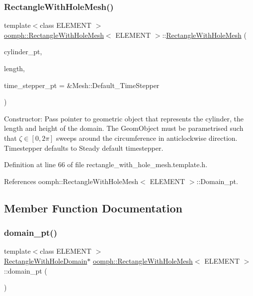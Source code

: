 \subsubsection{\texorpdfstring{Rectangle\+With\+Hole\+Mesh()}{RectangleWithHoleMesh()}}
{\footnotesize\ttfamily template$<$class E\+L\+E\+M\+E\+NT $>$ \\
\hyperlink{classoomph_1_1RectangleWithHoleMesh}{oomph\+::\+Rectangle\+With\+Hole\+Mesh}$<$ E\+L\+E\+M\+E\+NT $>$\+::\hyperlink{classoomph_1_1RectangleWithHoleMesh}{Rectangle\+With\+Hole\+Mesh} (\begin{DoxyParamCaption}\item[{Geom\+Object $\ast$}]{cylinder\+\_\+pt,  }\item[{const double \&}]{length,  }\item[{Time\+Stepper $\ast$}]{time\+\_\+stepper\+\_\+pt = {\ttfamily \&Mesh\+:\+:Default\+\_\+TimeStepper} }\end{DoxyParamCaption})\hspace{0.3cm}{\ttfamily [inline]}}



Constructor\+: Pass pointer to geometric object that represents the cylinder, the length and height of the domain. The Geom\+Object must be parametrised such that $\zeta \in [0,2\pi]$ sweeps around the circumference in anticlockwise direction. Timestepper defaults to Steady default timestepper. 



Definition at line 66 of file rectangle\+\_\+with\+\_\+hole\+\_\+mesh.\+template.\+h.



References oomph\+::\+Rectangle\+With\+Hole\+Mesh$<$ E\+L\+E\+M\+E\+N\+T $>$\+::\+Domain\+\_\+pt.



\subsection{Member Function Documentation}
\mbox{\label{classoomph_1_1RectangleWithHoleMesh_a800865b6bb11c07a505245967c0febd0}} 
\subsubsection{\texorpdfstring{domain\+\_\+pt()}{domain\_pt()}}
{\footnotesize\ttfamily template$<$class E\+L\+E\+M\+E\+NT $>$ \\
\hyperlink{classoomph_1_1RectangleWithHoleDomain}{Rectangle\+With\+Hole\+Domain}$\ast$ \hyperlink{classoomph_1_1RectangleWithHoleMesh}{oomph\+::\+Rectangle\+With\+Hole\+Mesh}$<$ E\+L\+E\+M\+E\+NT $>$\+::domain\+\_\+pt (\begin{DoxyParamCaption}{ }\end{DoxyParamCaption})\hspace{0.3cm}{\ttfamily [inline]}}



